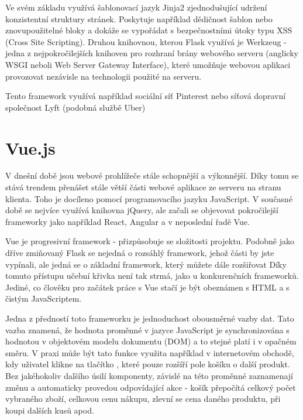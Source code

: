 Ve svém základu využívá šablonovací jazyk Jinja2 zjednodušující udržení konzistentní struktury stránek. Poskytuje například dědičnost šablon nebo znovupoužitelné bloky a dokáže se vypořádat s bezpečnostními útoky typu XSS (Cross Site Scripting). %
Druhou knihovnou, kterou Flask využívá je Werkzeug - jedna z nejpokročilejších knihoven pro rozhraní brány webového serveru (anglicky WSGI neboli Web Server Gateway Interface), které umožňuje webovou aplikaci provozovat nezávisle na technologii použité na serveru. %

Tento framework využívá například sociální síť Pinterest %
nebo síťová dopravní společnost Lyft %
(podobná službě Uber)

\section{Vue.js}\label{section:Vue.js}
V dnešní době jsou webové prohlížeče stále schopnější a výkonnější. Díky tomu se stává trendem přenášet stále větší části webové aplikace ze serveru na stranu klienta. Toho je docíleno pomocí programovacího jazyku JavaScript. V současné době se nejvíce využívá knihovna jQuery, %
ale začali se objevovat pokročilejší frameworky jako například React, Angular a v neposlední řadě Vue.

Vue je progresivní framework - přizpůsobuje se složitosti projektu. Podobně jako dříve zmiňovaný Flask se nejedná o rozsáhlý framework, jehož části by jste vypínali, ale jedná se o základní framework, který můžete dále rozšiřovat %
Díky tomuto přístupu učební křivka není tak strmá, jako u konkurenčních frameworků. Jediné, co člověku pro začátek práce s Vue stačí je být obeznámen s HTML a s čistým JavaScriptem.  %

Jedna z předností toto frameworku je jednoduchost obousměrné vazby dat. Tato vazba znamená, že hodnota proměnné v jazyce JavaScript je synchronizována s hodnotou v objektovém modelu dokumentu (DOM) a to stejné platí i v opačném směru. %
V praxi může být tato funkce využita například v internetovém obchodě, kdy uživatel klikne na tlačítko , které pouze rozšíří pole košíku o další produkt. Bez jakéhokoliv dalšího úsilí komponenty, závislé na této proměnné zaznamenají změnu a automaticky provedou odpovídající akce - košík přepočítá celkový počet vybraného zboží, celkovou cenu nákupu, zlevní se cena daného produktu, při koupi dalších kusů apod. 

